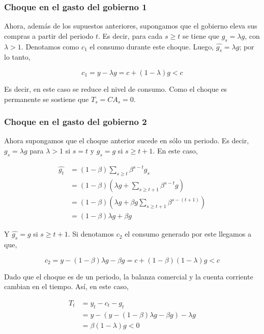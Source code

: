 \documentclass[]{article}
\begin{document}
\subsubsection{Choque en el gasto del gobierno
1}\label{choque-en-el-gasto-del-gobierno-1}

Ahora, además de los supuestos anteriores, supongamos que el gobierno
eleva sus compras a partir del periodo \(t\). Es decir, para cada
\(s \geq t\) se tiene que \(g_s = \lambda g\), con \(\lambda > 1\).
Denotamos como \(c_1\) el consumo durante este choque. Luego,
\(\hat{g_s} = \lambda g\); por lo tanto,

\[
c_1 = y - \lambda g = c + (1-\lambda)g < c
\]

Es decir, en este caso se reduce el nivel de consumo. Como el choque es
permanente se sostiene que \(T_s = CA_s = 0\).

\subsubsection{Choque en el gasto del gobierno
2}\label{choque-en-el-gasto-del-gobierno-2}

Ahora supongamos que el choque anterior sucede en sólo un periodo. Es
decir, \(g_s = \lambda g\) para \(\lambda >1\) si \(s = t\) y
\(g_s = g\) si \(s \geq t+1\). En este caso,

\[
\begin{align}
\hat{g_t} &= (1-\beta)\sum_{s\geq t} \beta^{s-t} g_s \\
&=(1-\beta)\left(\lambda g + \sum_{s\geq t+1}\beta^{s-t}g \right) \\
&= (1-\beta)\left(\lambda g + \beta g \sum_{s\geq t+1} \beta^{s-(t+1)}\right) \\
&= (1-\beta)\lambda g + \beta g 
\end{align}
\]

Y \(\hat{g_s} = g\) si \(s \geq t+1\). Si denotamos \(c_2\) el consumo
generado por este llegamos a que,

\[
c_2 = y - (1-\beta)\lambda g - \beta g = c + (1-\beta)(1-\lambda)g < c
\]

Dado que el choque es de un periodo, la balanza comercial y la cuenta
corriente cambian en el tiempo. Así, en este caso,

\[
\begin{align}
T_t &= y_t - c_t - g_t  \\
&= y - (y - (1-\beta)\lambda g - \beta g) - \lambda g \\
&= \beta (1 - \lambda) g < 0
\end{align}
\]
\end{document}
